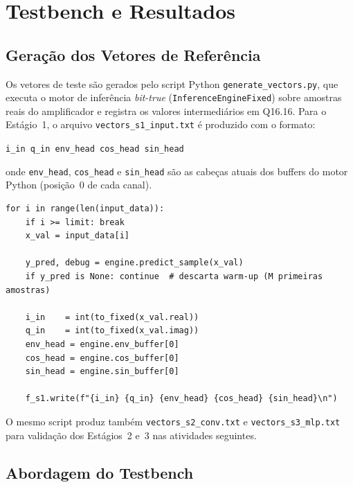 \documentclass[a4paper,12pt]{article}
\begin{document}
\section{Testbench e Resultados}

\subsection{Gera\c{c}\~ao dos Vetores de Refer\^encia}

Os vetores de teste s\~ao gerados pelo script Python \texttt{generate\_vectors.py}, que
executa o motor de infer\^encia \textit{bit-true} (\texttt{InferenceEngineFixed}) sobre
amostras reais do amplificador e registra os valores intermedi\'arios em Q16.16. Para o
Est\'agio~1, o arquivo \texttt{vectors\_s1\_input.txt} \'e produzido com o formato:

\begin{center}
\texttt{i\_in \quad q\_in \quad env\_head \quad cos\_head \quad sin\_head}
\end{center}

onde \texttt{env\_head}, \texttt{cos\_head} e \texttt{sin\_head} s\~ao as cabe\c{c}as
atuais dos buffers do motor Python (posi\c{c}\~ao~0 de cada canal).

\begin{lstlisting}[style=pystyle,
    caption={Trecho do \texttt{generate\_vectors.py}: gera\c{c}\~ao do arquivo de vetores do Est\'agio~1.},
    label={lst:genvec}]
for i in range(len(input_data)):
    if i >= limit: break
    x_val = input_data[i]

    y_pred, debug = engine.predict_sample(x_val)
    if y_pred is None: continue  # descarta warm-up (M primeiras amostras)

    i_in    = int(to_fixed(x_val.real))
    q_in    = int(to_fixed(x_val.imag))
    env_head = engine.env_buffer[0]
    cos_head = engine.cos_buffer[0]
    sin_head = engine.sin_buffer[0]

    f_s1.write(f"{i_in} {q_in} {env_head} {cos_head} {sin_head}\n")
\end{lstlisting}

O mesmo script produz tamb\'em \texttt{vectors\_s2\_conv.txt} e \texttt{vectors\_s3\_mlp.txt}
para valida\c{c}\~ao dos Est\'agios~2 e~3 nas atividades seguintes.

\subsection{Abordagem do Testbench}
\end{document}
